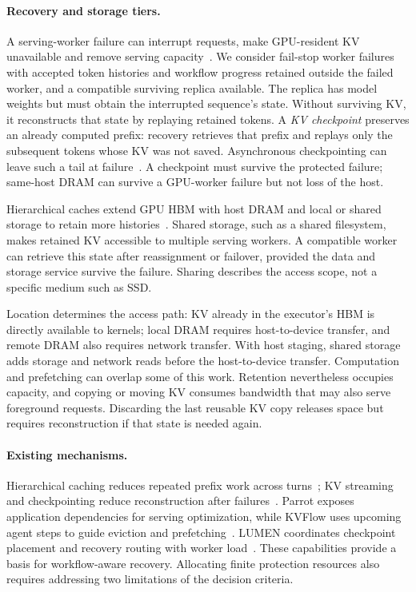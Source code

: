 \paragraph{Recovery and storage tiers.}
A serving-worker failure can interrupt requests, make GPU-resident KV
unavailable and remove serving capacity~\cite{cao2026lumen}. We consider
fail-stop worker failures with accepted token histories and workflow
progress retained outside the failed worker, and a compatible surviving
replica available. The replica has model weights but must obtain the
interrupted sequence's state. Without surviving KV, it reconstructs that
state by replaying retained tokens. A \emph{KV checkpoint} preserves an
already computed prefix: recovery retrieves that prefix and replays only
the subsequent tokens whose KV was not saved. Asynchronous checkpointing
can leave such a tail at failure~\cite{strati2024dejavu,jayakody2026ghostserve}.
A checkpoint must survive the protected failure; same-host DRAM can
survive a GPU-worker failure but not loss of the host.

Hierarchical caches extend GPU HBM with host DRAM and local or shared
storage to retain more histories~\cite{gao2024cachedattention,qin2025mooncake}.
Shared storage, such as a shared filesystem, makes retained KV accessible
to multiple serving workers. A compatible worker can retrieve this state
after reassignment or failover, provided the data and storage service
survive the failure. Sharing describes the access scope, not a specific
medium such as SSD.

Location determines the access path: KV already in the executor's HBM
is directly available to kernels; local DRAM requires host-to-device
transfer, and remote DRAM also requires network transfer. With host
staging, shared storage adds storage and network reads before the
host-to-device transfer. Computation and prefetching can overlap some
of this work. Retention nevertheless occupies
capacity, and copying or moving KV consumes bandwidth that may also serve
foreground requests. Discarding the last reusable KV copy releases space
but requires reconstruction if that state is needed again.

\paragraph{Existing mechanisms.}
Hierarchical caching reduces repeated prefix work across
turns~\cite{gao2024cachedattention,qin2025mooncake}; KV streaming and
checkpointing reduce reconstruction after
failures~\cite{strati2024dejavu,jayakody2026ghostserve}.
Parrot exposes application dependencies for serving optimization, while
KVFlow uses upcoming agent steps to guide eviction and
prefetching~\cite{lin2024parrot,pan2025kvflow}. LUMEN coordinates
checkpoint placement and recovery routing with worker
load~\cite{cao2026lumen}. These capabilities provide a basis for
workflow-aware recovery. Allocating finite protection resources also
requires addressing two limitations of the decision criteria.

